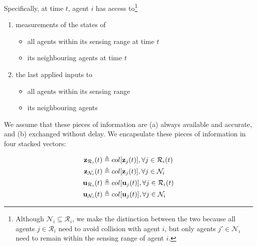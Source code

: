 Specifically, at time $t$, agent $i$ has access to\footnote{Although
    $\mathcal{N}_i \subseteq \mathcal{R}_i$, we make the distinction between
    the two because all agents $j \in \mathcal{R}_i$ need to avoid collision
    with agent $i$, but only agents $j' \in \mathcal{N}_i$ need to remain
    within the sensing range of agent $i$.}

\begin{enumerate}
  \item measurements of the states of
    \begin{itemize}
      \item all agents within its sensing range at time $t$
      \item its neighbouring agents at time $t$
      \end{itemize}
    \item the last applied inputs to
      \begin{itemize}
        \item all agents within its sensing range
        \item its neighbouring agents
      \end{itemize}
\end{enumerate}

We assume that these pieces of information are (a) always available and
accurate, and (b) exchanged without delay. We encapsulate these pieces of
information in four stacked vectors:

\begin{align}
  \bm{\mathbf{z}}_{\mathcal{R}_i}(t) &\triangleq col[\bm{\mathbf{z}}_j(t)], \forall j \in \mathcal{R}_i(t) \\
  \bm{\mathbf{z}}_{\mathcal{N}_i}(t) &\triangleq col[\bm{\mathbf{z}}_j(t)], \forall j \in \mathcal{N}_i \\
  \bm{\mathbf{u}}_{\mathcal{R}_i}(t) &\triangleq col[\bm{\mathbf{u}}_j(t)], \forall j \in \mathcal{R}_i(t) \\
  \bm{\mathbf{u}}_{\mathcal{N}_i}(t) &\triangleq col[\bm{\mathbf{u}}_j(t)], \forall j \in \mathcal{N}_i
\end{align}

